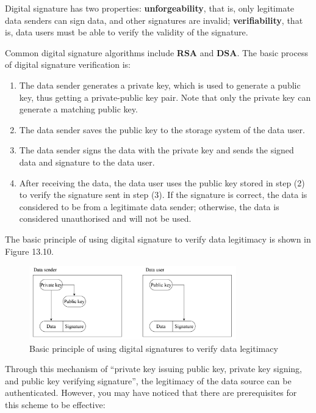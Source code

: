 \documentclass[a4paper,12pt,openany]{book}
\begin{document}
Digital signature has two properties: \textbf{unforgeability}, that is, only legitimate data senders can sign data, and other signatures are invalid; \textbf{verifiability}, that is, data users must be able to verify the validity of the signature.

Common digital signature algorithms include \textbf{RSA} and \textbf{DSA}. The basic process of digital signature verification is:

\begin{enumerate}[label=(\arabic*)]
    \item The data sender generates a private key, which is used to generate a public key, thus getting a private-public key pair. Note that only the private key can generate a matching public key.
    \item The data sender saves the public key to the storage system of the data user.
    \item The data sender signs the data with the private key and sends the signed data and signature to the data user.
    \item After receiving the data, the data user uses the public key stored in step (2) to verify the signature sent in step (3). If the signature is correct, the data is considered to be from a legitimate data sender; otherwise, the data is considered unauthorised and will not be used.
\end{enumerate}

The basic principle of using digital signature to verify data legitimacy is shown in Figure 13.10.

\begin{figure}[!h]
    \centering
    \includegraphics[width=0.8\textwidth]{D13Z/13-10}
    \caption{Basic principle of using digital signatures to verify data legitimacy}
\end{figure}

Through this mechanism of “private key issuing public key, private key signing, and public key verifying signature”, the legitimacy of the data source can be authenticated. However, you may have noticed that there are prerequisites for this scheme to be effective:
\end{document}
